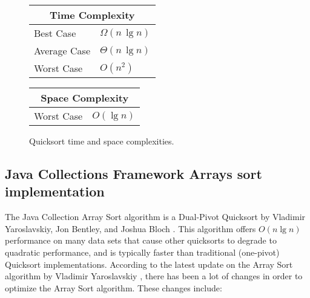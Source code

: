 \begin{figure}[!ht]
    \centering
    \begin{tabular}{l|l}
    \multicolumn{2}{c}{\textbf{Time Complexity}} \\
    \hline
    Best Case    & $\Omega(n \, \lg n)$ \\
    Average Case & $\Theta(n \, \lg n)$ \\
    Worst Case   & $O(n^2)$ \\
    \end{tabular}
    \quad\quad
    \begin{tabular}{l|l}
    \multicolumn{2}{c}{\textbf{Space Complexity}} \\
    \hline
    Worst Case   & $O(\lg n)$
    \end{tabular}
    
    \caption{Quicksort time\cite{clrs2009} and space complexities\cite{big-o}.}
    \label{fig:quicksort}
\end{figure}

\subsection{Java Collections Framework Arrays sort implementation}
The Java Collection Array Sort algorithm is a Dual-Pivot Quicksort by Vladimir Yaroslavskiy, Jon Bentley, and Joshua Bloch \cite{JavaCollectionFrameworkArraysSort}. This algorithm offers $O(n \lg n)$ performance on many data sets that cause other quicksorts to degrade to quadratic performance, and is typically faster than traditional (one-pivot) Quicksort implementations. According to the latest update on the Array Sort algorithm by Vladimir Yaroslavskiy \cite{VladimirYaroslavskiy}, there has been a lot of changes in order to optimize the Array Sort algorithm. These changes include: 

